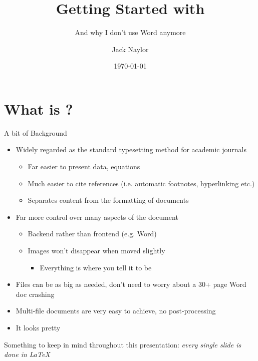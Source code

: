 \documentclass[10pt]{beamer}
\title{Getting Started with \text{\LaTeX}}
\subtitle{And why I don't use Word anymore}
\date{\today}
\author{Jack Naylor}
\institute{Treasurer - PhySoc, University of Sydney}
\begin{document}
\maketitle
\section{What is \text{\LaTeX}?}
\begin{frame}{A bit of Background}
    \begin{itemize}
\item Widely regarded as the standard typesetting method for academic journals
\begin{itemize}
\item Far easier to present data, equations
\item Much easier to cite references (i.e. automatic footnotes, hyperlinking etc.)
\item Separates content from the formatting of documents
\end{itemize}
\item Far more control over many aspects of the document
\begin{itemize}
\item Backend rather than frontend (e.g. Word)
\item Images won't disappear when moved slightly
\begin{itemize}
\item Everything is where you tell it to be
\end{itemize}
\end{itemize}
\end{itemize}
\end{frame}
\begin{frame}
\begin{itemize}
\item Files can be as big as needed, don't need to worry about a 30+ page Word doc crashing
\item Multi-file documents are very easy to achieve, no post-processing
\item It looks \alert{pretty}
\end{itemize}
\end{frame}
\begin{frame}
\centering
Something to keep in mind throughout this presentation: \emph{\alert{every single slide} is done in \LaTeX}
\end{frame}
\end{document}

